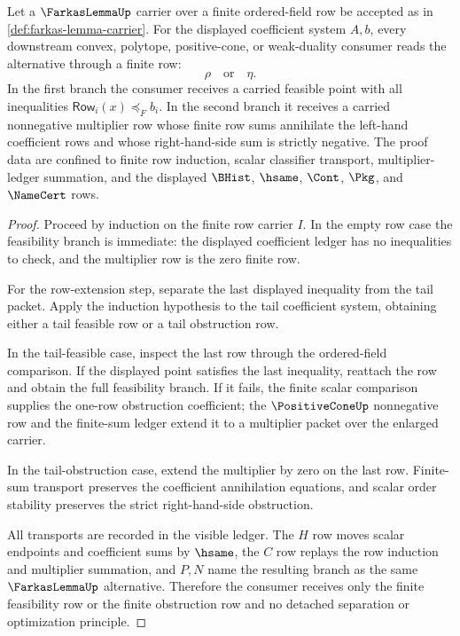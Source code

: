 \begin{theorem}
\label{thm:farkas-lemma-finite-alternative}
Let a $\FarkasLemmaUp$ carrier over a finite ordered-field row be accepted as in \autoref{def:farkas-lemma-carrier}. For the displayed coefficient system $A,b$, every downstream convex, polytope, positive-cone, or weak-duality consumer reads the alternative through a finite row:
$$
\rho
\quad\text{or}\quad
\eta .
$$
In the first branch the consumer receives a carried feasible point with all inequalities $\mathsf{Row}_{i}(x)\preceq_F b_i$. In the second branch it receives a carried nonnegative multiplier row whose finite row sums annihilate the left-hand coefficient rows and whose right-hand-side sum is strictly negative. The proof data are confined to finite row induction, scalar classifier transport, multiplier-ledger summation, and the displayed $\BHist$, $\hsame$, $\Cont$, $\Pkg$, and $\NameCert$ rows.
\end{theorem}
\begin{proof}
Proceed by induction on the finite row carrier $I$. In the empty row case the feasibility branch is immediate: the displayed coefficient ledger has no inequalities to check, and the multiplier row is the zero finite row.

For the row-extension step, separate the last displayed inequality from the tail packet. Apply the induction hypothesis to the tail coefficient system, obtaining either a tail feasible row or a tail obstruction row.

In the tail-feasible case, inspect the last row through the ordered-field comparison. If the displayed point satisfies the last inequality, reattach the row and obtain the full feasibility branch. If it fails, the finite scalar comparison supplies the one-row obstruction coefficient; the $\PositiveConeUp$ nonnegative row and the finite-sum ledger extend it to a multiplier packet over the enlarged carrier.

In the tail-obstruction case, extend the multiplier by zero on the last row. Finite-sum transport preserves the coefficient annihilation equations, and scalar order stability preserves the strict right-hand-side obstruction.

All transports are recorded in the visible ledger. The $H$ row moves scalar endpoints and coefficient sums by $\hsame$, the $C$ row replays the row induction and multiplier summation, and $P,N$ name the resulting branch as the same $\FarkasLemmaUp$ alternative. Therefore the consumer receives only the finite feasibility row or the finite obstruction row and no detached separation or optimization principle.
\end{proof}

